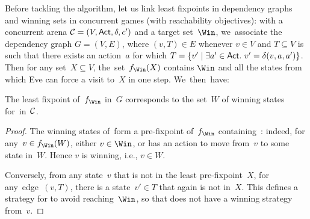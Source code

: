 Before tackling the algorithm, let us link least fixpoints in
dependency graphs and winning sets in concurrent games (with
reachability objectives): with a concurrent arena
$\mathcal C=(V,\textsf{Act},\delta,c')$ and a target set~$\Win$, we~associate
the dependency graph $G=(V,E)$, where $(v,T)\in E$ whenever $v\in V$
and $T\subseteq V$ is such that there exists an action~$a$ for which
$T=\{v' \mid \exists a'\in\Act.\ v'=\delta(v,a,a')\}$.  Then for any
set~$X\subseteq V$, the~set~$f_{\Win}(X)$ contains $\Win$ and all the
states from which Eve can force a visit to~$X$ in one step.
We~then~have:
\begin{proposition}\label{9-prop:fixp-game}
The least fixpoint of~$f_{\Win}$ in~$G$ corresponds to the set~$W$ of
winning states for~\Eve in~$\mathcal C$.
\end{proposition}

\begin{proof}
  The winning states of~\Eve form a pre-fixpoint of~$f_{\Win}$
  containing~\Win: indeed, for any~$v\in f_{\Win}(W)$, either $v\in
  \Win$, or \Eve has an action to move from~$v$ to some state
  in~$W$. Hence $v$ is winning, i.e., $v\in W$.
  

  Conversely, from any state~$v$ that is not in the least
  pre-fixpoint~$X$, for any~edge~$(v,T)$, there is a state~$v'\in T$
  that again is not in~$X$. This defines a strategy for \Adam to avoid
  reaching~$\Win$, so that \Eve does not have a winning strategy from~$v$.
\end{proof}



